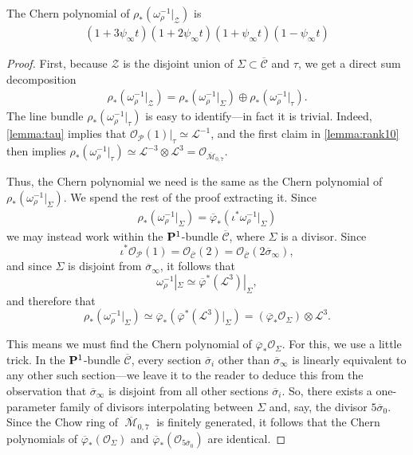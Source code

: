 \documentclass[12pt,reqno]{amsart}
\DeclareMathOperator{\M}{\mathcal{M}}
\numberwithin{equation}{section}
\renewcommand{\O}{\mathcal O}
\newcommand{\cP}{\mathcal P}
\newcommand{\cC}{\mathcal{C}}
\renewcommand {\o}[1]{\overline{#1}}
\begin{document}
\begin{proposition}
  \label{prop:omegarestrictZ} The Chern polynomial of $\rho_{*}(\omega_{\rho}^{-1}|_{\mathcal{Z}})$ is
  \begin{align}
    \label{eq:rank6}
    (1+3\psi_{\infty}t) (1+2\psi_{\infty}t) (1+\psi_{\infty}t)  (1-\psi_{\infty}t)
  \end{align}
\end{proposition}

\begin{proof}
  First, because $\mathcal{Z}$ is the disjoint union of
  $\Sigma \subset \o{\mathcal{C}}$ and $\tau$, we get a direct sum
  decomposition
  \begin{align}
    \label{eq:dirsum}
    \rho_{*}(\omega_{\rho}^{-1}|_{\mathcal{Z}}) = \rho_{*}(\omega_{\rho}^{-1}|_{\Sigma}) \oplus \rho_{*}(\omega_{\rho}^{-1}|_{\tau}).
  \end{align}
  The line bundle $\rho_{*}(\omega_{\rho}^{-1}|_{\tau})$ is easy to
  identify---in fact it is trivial.  Indeed, \autoref{lemma:tau}
  implies that $\O_{\cP}(1)|_{\tau} \simeq \mathcal{L}^{-1}$, and the
  first claim in \autoref{lemma:rank10} then implies
  $\rho_{*}(\omega_{\rho}^{-1}|_{\tau}) \simeq \mathcal{L}^{-3}
  \otimes \mathcal{L}^{3} = \O_{\o{\M}_{0,7}}$.

  Thus, the Chern polynomial we need is the same as the Chern
  polynomial of $\rho_{*}(\omega_{\rho}^{-1}|_{\Sigma})$. We spend
  the rest of the proof extracting it.  Since
  \begin{align*}
    \rho_{*}(\omega_{\rho}^{-1}|_{\Sigma}) = \o{\varphi}_{*}(\iota^{*}\omega_{\rho}^{-1}|_{\Sigma})
  \end{align*}
  we may instead work within the $\P^{1}$-bundle $\o{\cC}$, where
  $\Sigma$ is a divisor.  Since
  $$\iota^{*}\O_{\cP}(1) = \O_{\o{\cC}}(2) = \O_{\o{\cC}}(2\o{\sigma}_{\infty}),$$
  and since $\Sigma$ is disjoint from $\o{\sigma}_{\infty}$, it follows that
  $$\omega_{\rho}^{-1}|_{\Sigma} \simeq \o{\varphi}^{*}(\mathcal{L}^{3})|_{\Sigma},$$ and therefore that
  $$\rho_{*}(\omega_{\rho}^{-1}|_{\Sigma}) \simeq \o{\varphi}_{*}(\o{\varphi}^{*}(\mathcal{L}^{3})|_{\Sigma}) = (\o{\varphi}_{*}\O_{\Sigma})\otimes \mathcal{L}^{3}.$$

  This means we must find the Chern polynomial of
  $\o{\varphi}_{*}\O_{\Sigma}$.  For this, we use a little trick.  In
  the $\P^{1}$-bundle $\o{\cC}$, every section $\o{\sigma}_{i}$ other
  than $\o{\sigma}_{\infty}$ is linearly equivalent to any other such
  section---we leave it to the reader to deduce this from the
  observation that $\o{\sigma}_{\infty}$ is disjoint from all other
  sections $\o{\sigma}_{i}$.  So, there exists a one-parameter family
  of divisors interpolating between $\Sigma$ and, say, the divisor
  $5\o{\sigma}_{0}$.  Since the Chow ring of $\o{\M}_{0,7}$ is
  finitely generated, it follows that the Chern polynomials of
  $\o{\varphi}_{*}(\O_{\Sigma})$ and
  $\o{\varphi}_{*}(\O_{5 \o{\sigma}_{0}})$ are identical.


\end{proof}
\end{document}
